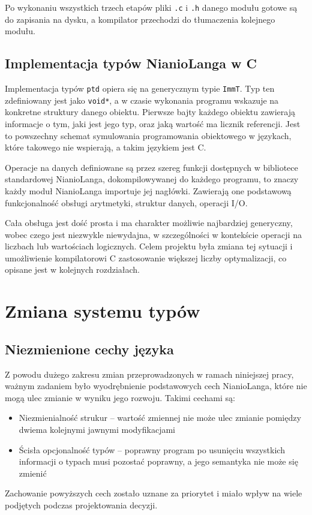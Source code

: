 \documentclass[licencjacka]{pracamgr}
\begin{document}
Po wykonaniu wszystkich trzech etapów pliki \texttt{.c} i \texttt{.h} danego modułu gotowe są do zapisania na dysku, a kompilator przechodzi do
tłumaczenia kolejnego modułu.
\section{Implementacja typów NianioLanga w C}
\label{sec:c_types_implementation}
Implementacja typów \texttt{ptd} opiera się na generycznym typie \texttt{ImmT}. Typ ten zdefiniowany jest jako \texttt{void*}, a w czasie wykonania
programu wskazuje na konkretne struktury danego obiektu. Pierwsze bajty każdego obiektu zawierają informacje o tym, jaki jest jego typ, oraz jaką
wartość ma licznik referencji. Jest to powszechny schemat symulowania programowania obiektowego w językach, które takowego nie wspierają, a takim
językiem jest C.


Operacje na danych definiowane są przez szereg funkcji dostępnych w bibliotece standardowej NianioLanga, dokompilowywanej do każdego programu, to
znaczy każdy moduł NianioLanga importuje jej nagłówki. Zawierają one podstawową funkcjonalność obsługi arytmetyki, struktur danych, operacji I/O.


Cała obsługa jest dość prosta i ma charakter możliwie najbardziej generyczny, wobec czego jest niezwykle niewydajna, w szczególności w kontekście
operacji na liczbach lub wartościach logicznych. Celem projektu była zmiana tej sytuacji i umożliwienie kompilatorowi C zastosowanie większej liczby
optymalizacji, co opisane jest w kolejnych rozdziałach.


\chapter{Zmiana systemu typów}
\section{Niezmienione cechy języka}
Z powodu dużego zakresu zmian przeprowadzonych w ramach niniejszej pracy, ważnym zadaniem było wyodrębnienie
podstawowych cech NianioLanga, które nie mogą ulec zmianie w wyniku jego rozwoju. Takimi cechami są:
\begin{itemize}
 \item Niezmienialność strukur -- wartość zmiennej nie może ulec zmianie pomiędzy dwiema kolejnymi jawnymi
 modyfikacjami
 \item Ścisła opcjonalność typów -- poprawny program po usunięciu wszystkich informacji o typach musi pozostać
 poprawny, a jego semantyka nie może się zmienić
\end{itemize}
Zachowanie powyższych cech zostało uznane za priorytet i miało wpływ na wiele podjętych podczas projektowania
decyzji.
\end{document}
